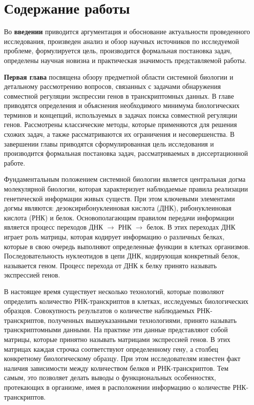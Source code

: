 \section*{Содержание работы}
Во \textbf{введении} приводится аргументация и обоснование актуальности проведенного исследования, произведен анализ и обзор научных источников по исследуемой проблеме, формулируется цель, производится формальная постановка задач, определены научная новизна и практическая значимость представляемой работы.


\textbf{Первая глава} посвящена обзору предметной области системной биологии и детальному рассмотрению вопросов, связанных с задачами обнаружения совместной регуляции экспрессии генов в транскриптомных данных. 
В главе приводятся определения и объяснения необходимого минимума биологических терминов и концепций, используемых в задачах поиска совместной регуляции генов. Рассмотрены классические методы, которые применяются для решения схожих задач, а также рассматриваются их ограничения и несовершенства. 
В завершении главы приводятся сформулированная цель исследования и производится формальная постановка задач, рассматриваемых в диссертационной работе.

Фундаментальным положением системной биологии является центральная догма молекулярной биологии, которая характеризует наблюдаемые правила реализации генетической информации живых существ.
При этом ключевыми элементами догмы являются: дезоксирибонуклеиновая кислота (ДНК), рибонуклеиновая кислота (РНК) и белок.
Основополагающим правилом передачи информации является процесс переходов {ДНК $\rightarrow$ РНК $\rightarrow$ белок}.
В этих переходах ДНК играет роль матрицы, которая кодирует информацию о различных белках, которые в свою очередь выполняют определенные функции в клетках организмов.
Последовательность нуклеотидов в цепи ДНК, кодирующая конкретный белок, называется геном.
Процесс перехода от ДНК к белку принято называть экспрессией генов.

В настоящее время существует несколько технологий, которые позволяют определить количество РНК-транскриптов в клетках, исследуемых биологических образцов.
Совокупность результатов о количестве наблюдаемых РНК-транскриптов, полученных вышеуказанными технологиями, принято называть транскриптомными данными.
На практике эти данные представляют собой матрицы, которые принятно называть матрицами экспрессией генов.
В этих матрицах каждая строчка соответствуют определенному гену, а столбец конкретному биологическому образцу.
При этом исследователям известен факт наличия зависимости между количеством белков и РНК-транскриптов.
Тем самым, это позволяет делать выводы о функциональных особенностях, протекающих в организме, имея в расположении информацию о количестве РНК-транскриптов.


